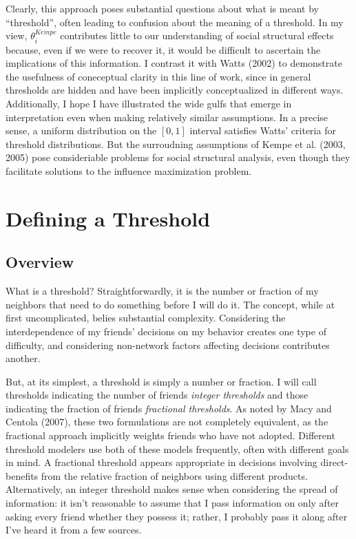 \documentclass{article}
\begin{document}
Clearly, this approach poses substantial questions about what is meant by ``threshold'', often leading to confusion about the meaning of a threshold. In my view, $\theta_i^{Kempe}$ contributes little to our understanding of social structural effects because, even if we were to recover it, it would be difficult to ascertain the implications of this information. I contrast it with Watts (2002) to demonstrate the usefulness of coneceptual clarity in this line of work, since in general thresholds are hidden and have been implicitly conceptualized in different ways. Additionally, I hope I have illustrated the wide gulfs that emerge in interpretation even when making relatively similar assumptions. In a precise sense, a uniform distribution on the $[0,1]$ interval satisfies Watts' criteria for threshold distributions. But the surroudning assumptions of Kempe et al. (2003, 2005) pose consideriable problems for social structural analysis, even though they facilitate solutions to the influence maximization problem.

\section{Defining a Threshold}

\subsection{Overview}

What is a threshold? Straightforwardly, it is the number or fraction of my neighbors that need to do something before I will do it. The concept, while at first uncomplicated, belies substantial complexity. Considering the interdependence of my friends' decisions on my behavior creates one type of difficulty, and considering non-network factors affecting decisions contributes another. 

But, at its simplest, a threshold is simply a number or fraction. I will call thresholds indicating the number of friends \emph{integer thresholds} and those indicating the fraction of friends \emph{fractional thresholds}. As noted by Macy and Centola (2007), these two formulations are not completely equivalent, as the fractional approach implicitly weights friends who have not adopted. Different threshold modelers use both of these models frequently, often with different goals in mind. A fractional threshold appears appropriate in decisions involving direct-benefits from the relative fraction of neighbors using different products. Alternatively, an integer threshold makes sense when considering the spread of information: it isn't reasonable to assume that I pass information on only after asking every friend whether they possess it; rather, I probably pass it along after I've heard it from a few sources.
\end{document}
